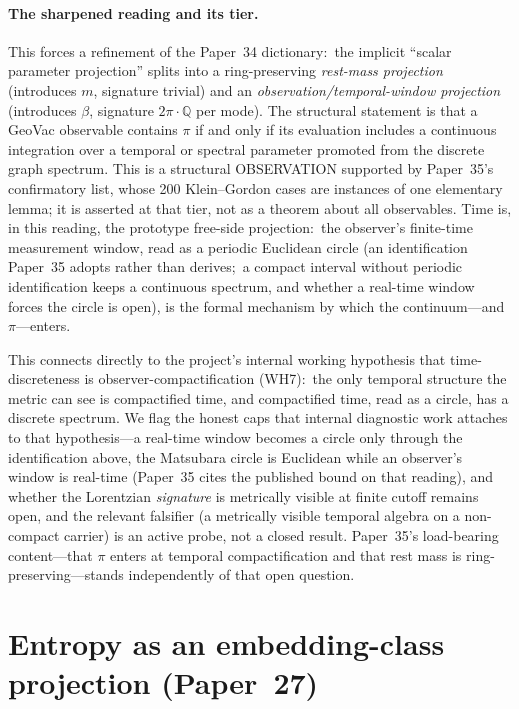 \documentclass[aps,pra,twocolumn,superscriptaddress,longbibliography,nofootinbib]{revtex4-2}
\newcommand{\gvc}[2]{#2}
\begin{document}
\paragraph{The sharpened reading and its tier.}
This forces a refinement of the Paper~34 dictionary:\ the implicit
``scalar parameter projection'' splits into a ring-preserving
\emph{rest-mass projection} (introduces $m$, signature trivial) and an
\emph{observation/temporal-window projection} (introduces $\beta$,
signature $2\pi\cdot\mathbb{Q}$ per mode).  The structural statement is
that a GeoVac observable contains $\pi$ if and only if its evaluation
includes a continuous integration over a temporal or spectral parameter
promoted from the discrete graph spectrum.  This is a structural
OBSERVATION supported by Paper~35's confirmatory list, whose 200
Klein--Gordon cases are instances of one elementary lemma; it is asserted
at that tier, not as a theorem about all observables.
Time is, in this reading, the prototype free-side projection:\ the
observer's finite-time measurement window, \gvc{p35-window-circle-adopted}{read as a periodic Euclidean
circle (an identification Paper~35 adopts rather than derives;\ a compact
interval without periodic identification keeps a continuous spectrum,
and whether a real-time window forces the circle is open)}, is the
formal mechanism by
which the continuum---and $\pi$---enters.

This connects directly to the project's internal working hypothesis that
time-discreteness is observer-compactification (WH7):\ the only temporal
structure the metric can see is compactified time, and compactified time,
read as a circle, has a discrete spectrum.  We flag the honest caps that internal diagnostic work
attaches to that hypothesis---\gvc{p35-window-circle-adopted}{a real-time window becomes a circle only
through the identification above}, the Matsubara circle is Euclidean
while an observer's window is real-time (Paper~35 cites the published
bound on that reading), and whether the Lorentzian
\emph{signature} is metrically visible at finite cutoff remains open, and
the relevant falsifier (a metrically visible temporal algebra on a
non-compact carrier) is an active probe, not a closed result.  Paper~35's
load-bearing content---that $\pi$ enters at temporal compactification and
that rest mass is ring-preserving---stands independently of that open
question.

\section{Entropy as an embedding-class projection (Paper~27)}
\end{document}
